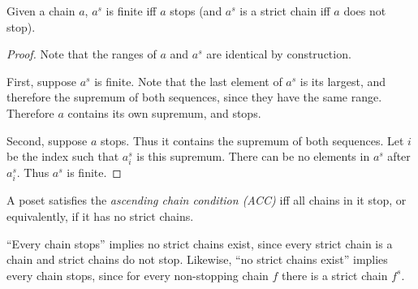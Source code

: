 \documentclass{article}
\begin{document}
\begin{lemma}
  Given a chain $a$, $a^s$ is finite iff $a$ stops (and $a^s$ is a strict chain
  iff $a$ does not stop).
\end{lemma}
\begin{proof}
  Note that the ranges of $a$ and $a^s$ are identical by construction.

  First, suppose $a^s$ is finite. Note that the last element of $a^s$ is its
  largest, and therefore the supremum of both sequences, since they have the
  same range. Therefore $a$ contains its own supremum, and stops.

  Second, suppose $a$ stops. Thus it contains the supremum of both sequences.
  Let $i$ be the index such that $a^s_i$ is this supremum. There can be no
  elements in $a^s$ after $a^s_i$. Thus $a^s$ is finite.
\end{proof}

\begin{definition}[ACC]
  A poset satisfies the \emph{ascending chain condition (ACC)} iff all chains in
  it stop, or equivalently, if it has no strict chains.
\end{definition}

``Every chain stops'' implies no strict chains exist, since every strict chain
is a chain and strict chains do not stop. Likewise, ``no strict chains exist''
implies every chain stops, since for every non-stopping chain $f$ there is a
strict chain $f^s$.


\end{document}
